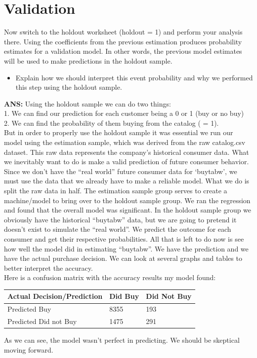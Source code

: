 \documentclass[a4paper,12pt]{article}
\begin{document}
\section{Validation}
Now switch to the holdout worksheet (holdout = 1) and perform your
analysis there. Using the coefficients from the previous estimation produces probability
estimates for a validation model. In other words, the previous model estimates will be
used to make predictions in the holdout sample.
\begin{itemize}
\item Explain how we should interpret this event probability and why we performed
this step using the holdout sample.
\end{itemize}
\textbf{ANS:} 
Using the holdout sample we can do two things:\\ 
1. We can find our prediction for each customer being a 0 or 1 (buy or no buy)\\
2. We can find the probability of them buying from the catalog ( = 1).\\
But in order to properly use the holdout sample it was essential we run our model 
using the estimation sample, which was derived from the raw catalog.csv dataset. This 
raw data represents the company's historical consumer data. What we inevitably want 
to do is make a valid prediction of future consumer behavior. Since we don't have the
``real world'' future consumer data for `buytabw', we must use the data that we 
already have to make a reliable model. What we do is split the raw data in half. 
The estimation sample group serves to create a machine/model to bring over to the 
holdout sample group. We ran the regression and found that the overall model was 
significant. In the holdout sample group we obviously have the historical ``buytabw''
data, but we are going to pretend it doesn't exist to simulate the ``real world''. 
We predict the outcome for each consumer and get their respective probabilities. 
All that is left to do now is see how well the model did in estimating ``buytabw''.
We have the prediction and we have the actual purchase decision. We can look at several
graphs and tables to better interpret the accuracy.\\
Here is a confusion matrix with the accuracy results my model found:
\vspace{12pt}
\begin{table}[H]
\begin{tabular}{l|l|l}
Actual Decision/Prediction &Did Buy& Did Not Buy \\
\hline
Predicted Buy & 8355 & 193 \\
\hline
Predicted Did not Buy & 1475 & 291 \\
\end{tabular}
\end{table}
As we can see, the model wasn't perfect in predicting. We should be skeptical moving forward. 
\end{document}
